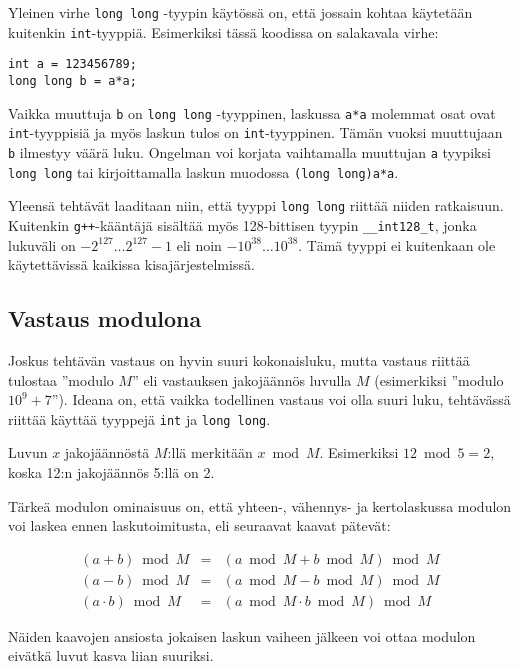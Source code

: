 Yleinen virhe \texttt{long long} -tyypin käytössä on,
että jossain kohtaa käytetään kuitenkin \texttt{int}-tyyppiä.
Esimerkiksi tässä koodissa on salakavala virhe:

\begin{lstlisting}
int a = 123456789;
long long b = a*a;
\end{lstlisting}

Vaikka muuttuja \texttt{b} on \texttt{long long} -tyyppinen,
laskussa \texttt{a*a} molemmat osat ovat \texttt{int}-tyyppisiä
ja myös laskun tulos on \texttt{int}-tyyppinen.
Tämän vuoksi muuttujaan \texttt{b} ilmestyy väärä luku.
Ongelman voi korjata vaihtamalla muuttujan \texttt{a}
tyypiksi \texttt{long long} tai kirjoittamalla
laskun muodossa \texttt{(long long)a*a}.

Yleensä tehtävät laaditaan niin, että tyyppi
\texttt{long long} riittää niiden ratkaisuun.
Kuitenkin \texttt{g++}-kääntäjä sisältää myös 128-bittisen
tyypin \texttt{\_\_int128\_t}, jonka lukuväli on
$-2^{127} \ldots 2^{127}-1$ eli noin $-10^{38} \ldots 10^{38}$.
Tämä tyyppi ei kuitenkaan ole käytettävissä kaikissa kisajärjestelmissä.

\subsection{Vastaus modulona}

Joskus tehtävän vastaus on hyvin suuri kokonaisluku,
mutta vastaus riittää tulostaa ''modulo $M$''
eli vastauksen jakojäännös luvulla $M$
(esimerkiksi ''modulo $10^9+7$'').
Ideana on, että vaikka todellinen vastaus
voi olla suuri luku,
tehtävässä riittää käyttää tyyppejä \texttt{int} ja \texttt{long long}.

Luvun $x$ jakojäännöstä $M$:llä
merkitään $x \bmod M$.
Esimerkiksi $12 \bmod 5 = 2$,
koska 12:n jakojäännös 5:llä on 2.

Tärkeä modulon ominaisuus on,
että yhteen-, vähennys- ja kertolaskussa
modulon voi laskea ennen laskutoimitusta,
eli seuraavat kaavat pätevät:

\[
\begin{array}{rcr}
(a+b) \bmod M & = & (a \bmod M + b \bmod M) \bmod M \\
(a-b) \bmod M & = & (a \bmod M - b \bmod M) \bmod M \\
(a \cdot b) \bmod M & = & (a \bmod M \cdot b \bmod M) \bmod M
\end{array}
\]

Näiden kaavojen ansiosta
jokaisen laskun vaiheen jälkeen voi ottaa modulon
eivätkä luvut kasva liian suuriksi.

